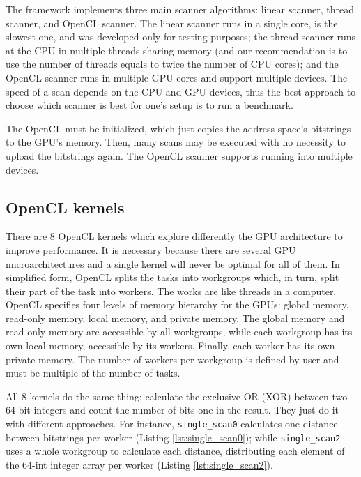 The framework implements three main scanner algorithms: linear scanner, thread scanner, and OpenCL scanner. The linear scanner runs in a single core, is the slowest one, and was developed only for testing purposes; the thread scanner runs at the CPU in multiple threads sharing memory (and our recommendation is to use the number of threads equals to twice the number of CPU cores); and the OpenCL scanner runs in multiple GPU cores and support multiple devices. The speed of a scan depends on the CPU and GPU devices, thus the best approach to choose which scanner is best for one's setup is to run a benchmark.

The OpenCL must be initialized, which just copies the address space's bitstrings to the GPU's memory. Then, many scans may be executed with no necessity to upload the bitstrings again. The OpenCL scanner supports running into multiple devices.

\subsection{OpenCL kernels}

There are 8 OpenCL kernels which explore differently the GPU architecture to improve performance. It is necessary because there are several GPU microarchitectures and a single kernel will never be optimal for all of them. In simplified form, OpenCL splits the tasks into workgroups which, in turn, split their part of the task into workers. The works are like threads in a computer. OpenCL specifies four levels of memory hierarchy for the GPUs: global memory, read-only memory, local memory, and private memory. The global memory and read-only memory are accessible by all workgroups, while each workgroup has its own local memory, accessible by its workers. Finally, each worker has its own private memory. The number of workers per workgroup is defined by user and must be multiple of the number of tasks.

All 8 kernels do the same thing: calculate the exclusive OR (XOR) between two 64-bit integers and count the number of bits one in the result. They just do it with different approaches. For instance, \lstinline{single_scan0} calculates one distance between bitstrings per worker (Listing \ref{lst:single_scan0}); while \lstinline{single_scan2} uses a whole workgroup to calculate each distance, distributing each element of the 64-int integer array per worker (Listing \ref{lst:single_scan2}).

